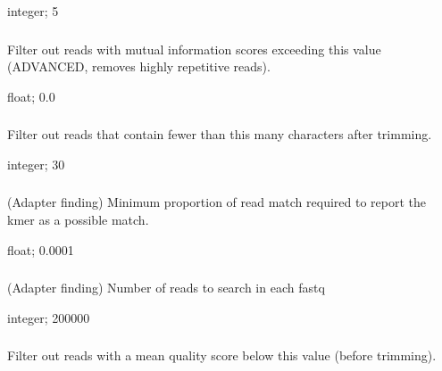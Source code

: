 \documentclass[letterpaper,10pt,english]{sphinxmanual}
\begin{document}
 integer;  5


\subsubsection{}
\label{\detokenize{prog_desc:i-filter-low-info}}
 Filter out reads with mutual information scores exceeding this value (ADVANCED, removes highly repetitive reads).

 float;  0.0


\subsubsection{}
\label{\detokenize{prog_desc:l-filter-length}}
 Filter out reads that contain fewer than this many characters after trimming.

 integer;  30


\subsubsection{}
\label{\detokenize{prog_desc:m-adapter-min-match}}
 (Adapter finding) Minimum proportion of read match required to report the kmer as a possible match.

 float;  0.0001


\subsubsection{}
\label{\detokenize{prog_desc:n-adapter-number-of-reads}}
 (Adapter finding) Number of reads to search in each fastq

 integer;  200000


\subsubsection{}
\label{\detokenize{prog_desc:q-filter-quality}}
 Filter out reads with a mean quality score below this value (before trimming).
\end{document}
